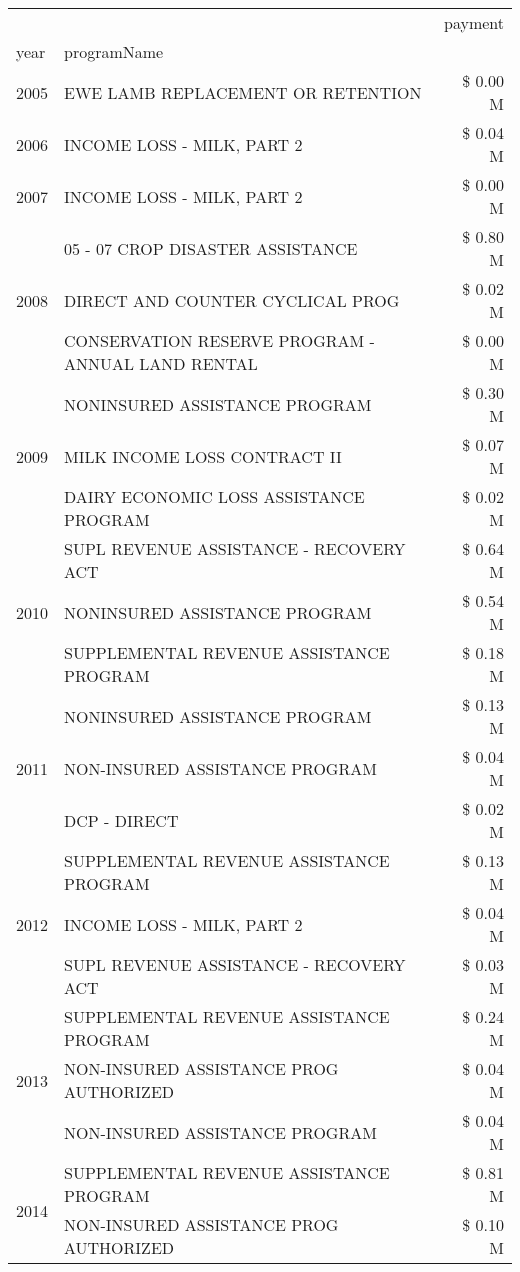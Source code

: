 \begin{tabular}{llr}
\toprule
 &  & payment \\
year & programName &  \\
\midrule
2005 & EWE LAMB REPLACEMENT OR RETENTION & \$ 0.00 M \\
\cline{1-3}
2006 & INCOME LOSS - MILK, PART 2 & \$ 0.04 M \\
\cline{1-3}
2007 & INCOME LOSS - MILK, PART 2 & \$ 0.00 M \\
\cline{1-3}
\multirow[t]{3}{*}{2008} & 05 - 07 CROP DISASTER ASSISTANCE & \$ 0.80 M \\
 & DIRECT AND COUNTER CYCLICAL PROG & \$ 0.02 M \\
 & CONSERVATION RESERVE PROGRAM - ANNUAL LAND RENTAL & \$ 0.00 M \\
\cline{1-3}
\multirow[t]{3}{*}{2009} & NONINSURED ASSISTANCE PROGRAM & \$ 0.30 M \\
 & MILK INCOME LOSS CONTRACT II & \$ 0.07 M \\
 & DAIRY ECONOMIC LOSS ASSISTANCE PROGRAM & \$ 0.02 M \\
\cline{1-3}
\multirow[t]{3}{*}{2010} & SUPL REVENUE ASSISTANCE - RECOVERY ACT & \$ 0.64 M \\
 & NONINSURED ASSISTANCE PROGRAM & \$ 0.54 M \\
 & SUPPLEMENTAL REVENUE ASSISTANCE PROGRAM & \$ 0.18 M \\
\cline{1-3}
\multirow[t]{3}{*}{2011} & NONINSURED ASSISTANCE PROGRAM & \$ 0.13 M \\
 & NON-INSURED ASSISTANCE PROGRAM & \$ 0.04 M \\
 & DCP - DIRECT & \$ 0.02 M \\
\cline{1-3}
\multirow[t]{3}{*}{2012} & SUPPLEMENTAL REVENUE ASSISTANCE PROGRAM & \$ 0.13 M \\
 & INCOME LOSS - MILK, PART 2 & \$ 0.04 M \\
 & SUPL REVENUE ASSISTANCE - RECOVERY ACT & \$ 0.03 M \\
\cline{1-3}
\multirow[t]{3}{*}{2013} & SUPPLEMENTAL REVENUE ASSISTANCE PROGRAM & \$ 0.24 M \\
 & NON-INSURED ASSISTANCE PROG AUTHORIZED & \$ 0.04 M \\
 & NON-INSURED ASSISTANCE PROGRAM & \$ 0.04 M \\
\cline{1-3}
\multirow[t]{3}{*}{2014} & SUPPLEMENTAL REVENUE ASSISTANCE PROGRAM & \$ 0.81 M \\
 & NON-INSURED ASSISTANCE PROG AUTHORIZED & \$ 0.10 M \\

\end{tabular}
